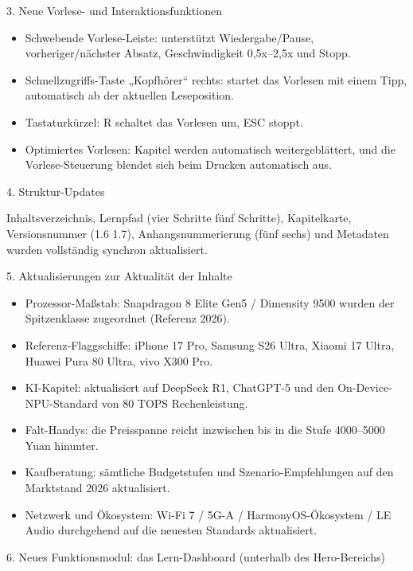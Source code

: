 3. Neue Vorlese- und Interaktionsfunktionen

\begin{itemize}
  \item Schwebende Vorlese-Leiste: unterstützt Wiedergabe/Pause, vorheriger/nächster Absatz, Geschwindigkeit 0,5x–2,5x und Stopp.
  \item Schnellzugriffs-Taste „Kopfhörer“ rechts: startet das Vorlesen mit einem Tipp, automatisch ab der aktuellen Leseposition.
  \item Tastaturkürzel: R schaltet das Vorlesen um, ESC stoppt.
  \item Optimiertes Vorlesen: Kapitel werden automatisch weitergeblättert, und die Vorlese-Steuerung blendet sich beim Drucken automatisch aus.
\end{itemize}

4. Struktur-Updates

Inhaltsverzeichnis, Lernpfad (vier Schritte fünf Schritte), Kapitelkarte, Versionsnummer (1.6 1.7), Anhangsnummerierung (fünf sechs) und Metadaten wurden vollständig synchron aktualisiert.

5. Aktualisierungen zur Aktualität der Inhalte

\begin{itemize}
  \item Prozessor-Maßstab: Snapdragon 8 Elite Gen5 / Dimensity 9500 wurden der Spitzenklasse zugeordnet (Referenz 2026).
  \item Referenz-Flaggschiffe: iPhone 17 Pro, Samsung S26 Ultra, Xiaomi 17 Ultra, Huawei Pura 80 Ultra, vivo X300 Pro.
  \item KI-Kapitel: aktualisiert auf DeepSeek R1, ChatGPT-5 und den On-Device-NPU-Standard von 80 TOPS Rechenleistung.
  \item Falt-Handys: die Preisspanne reicht inzwischen bis in die Stufe 4000–5000 Yuan hinunter.
  \item Kaufberatung: sämtliche Budgetstufen und Szenario-Empfehlungen auf den Marktstand 2026 aktualisiert.
  \item Netzwerk und Ökosystem: Wi-Fi 7 / 5G-A / HarmonyOS-Ökosystem / LE Audio durchgehend auf die neuesten Standards aktualisiert.
\end{itemize}

6. Neues Funktionsmodul: das Lern-Dashboard (unterhalb des Hero-Bereichs)

